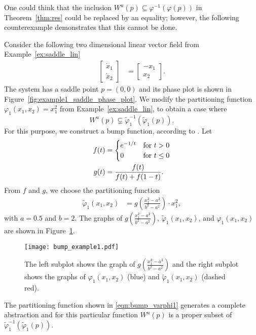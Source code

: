 One could think that the inclusion $W^{u}(p)\subseteq \varphi^{-1}(\varphi(p))$ in Theorem~\ref{thm:res} could be replaced by an equality; however, the following counterexample demonstrates that this cannot be done.
\begin{example}
Consider the following two dimensional linear vector field from Example~\ref{ex:saddle_lin}
\begin{align}
\begin{bmatrix}
\dot{x}_1\\
\dot{x}_2
\end{bmatrix}&=
\begin{bmatrix}
-x_1\\
x_2
\end{bmatrix}.
\end{align}
The system has a saddle point $p=(0,0)$ and its phase plot is shown in Figure~\ref{fig:example1_saddle_phase_plot}. We modify the partitioning function $\varphi_{1}(x_1,x_2)=x_1^2$ from Example~\ref{ex:saddle_lin}, to obtain a case where
\[W^{u}(p)\subsetneq\tilde{\varphi}_1^{-1}(\tilde{\varphi}_1(p)).\]
For this purpose, we construct a bump function, according to \cite{An_Introduction_to_Manifolds}. Let
\begin{align}
\notag f(t)&=\begin{cases}e^{-1/t}&\text{for }t>0\\0&\text{for }t\leq0\end{cases}\\
\notag g(t)&=\frac{f(t)}{f(t)+f(1-t)}.
\end{align}
From $f$ and $g$, we choose the partitioning function
\begin{align}
\tilde{\varphi}_{1}(x_1,x_2) &= g\left(\frac{x_1^2-a^2}{b^2-a^2}\right)\cdot x_1^2\label{eqn:bump_varphi1},
\end{align}
with $a=0.5$ and $b=2$. The graphs of $g\left(\frac{x_1^2-a^2}{b^2-a^2}\right)$, $\tilde{\varphi}_{1}(x_1,x_2)$, and $\varphi_{1}(x_1,x_2)$ are shown in Figure~\ref{fig:bump_example}.
\begin{figure}[!htb]
    \centering
       \texttt{[image: bump\_example1.pdf]}
    \caption{The left subplot shows the graph of $g\left(\frac{x_1^2-a^2}{b^2-a^2}\right)$ and the right subplot shows the graphs of $\varphi_{1}(x_1,x_2)$  (blue) and $\tilde{\varphi}_{1}(x_1,x_2)$ (dashed red).\label{fig:bump_example}}
\end{figure}

The partitioning function shown in \eqref{eqn:bump_varphi1} generates a complete abstraction and for this particular function $W^{u}(p)$ is a proper subset of $\tilde{\varphi}_1^{-1}(\tilde{\varphi}_1(p))$.
\end{example}


